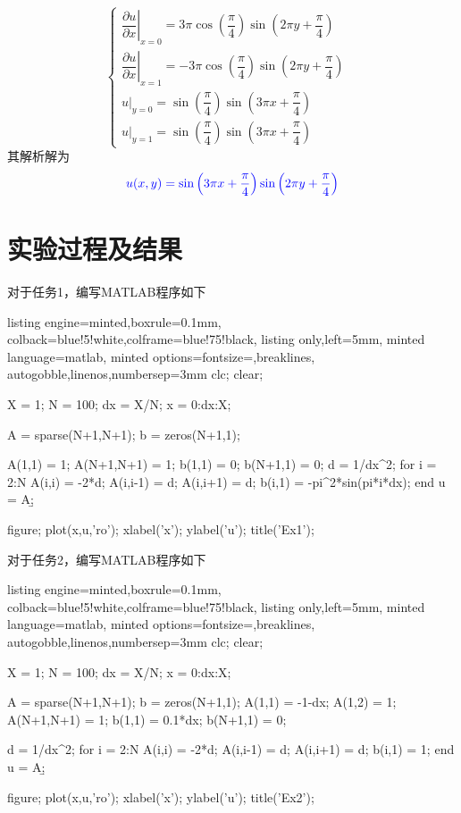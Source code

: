 \documentclass[12pt]{article}
\begin{document}
\begin{description}
\begin{equation*}
\begin{cases}
            \left.\dfrac{\partial u}{\partial x}\right|_{x=0}=3\pi\cos\left(\dfrac{\pi}{4}\right)\sin\left(2\pi y+\dfrac{\pi}{4}\right)&\\
            \left.\dfrac{\partial u}{\partial x}\right|_{x=1}=-3\pi\cos\left(\dfrac{\pi}{4}\right)\sin\left(2\pi y+\dfrac{\pi}{4}\right)&\\
            u|_{y=0}=\sin\left(\dfrac{\pi}{4}\right)\sin\left(3\pi x+\dfrac{\pi}{4}\right)&\\
            u|_{y=1}=\sin\left(\dfrac{\pi}{4}\right)\sin\left(3\pi x+\dfrac{\pi}{4}\right)
        \end{cases}
    \end{equation*}其解析解为\begin{equation*}
        \color{blue}u(x,y)=\sin\left(3\pi x+\dfrac{\pi}{4}\right)\sin\left(2\pi y+\dfrac{\pi}{4}\right)
    \end{equation*}
\end{description}

\newpage
\section{实验过程及结果}
对于任务1，编写MATLAB程序如下
\begin{tcblisting}{listing engine=minted,boxrule=0.1mm,
    colback=blue!5!white,colframe=blue!75!black,
    listing only,left=5mm,
    minted language=matlab,
    minted options={fontsize=\small,breaklines, autogobble,linenos,numbersep=3mm}}
clc;
clear;

X = 1;
N = 100;
dx = X/N;
x = 0:dx:X;

A = sparse(N+1,N+1);
b = zeros(N+1,1);

A(1,1) = 1;
A(N+1,N+1) = 1;
b(1,1) = 0;
b(N+1,1) = 0;
d = 1/dx^2;
for i = 2:N
    A(i,i) = -2*d;
    A(i,i-1) = d;
    A(i,i+1) = d;
    b(i,1) = -pi^2*sin(pi*i*dx);
end
u = A\b;

figure;
plot(x,u,'ro');
xlabel('x');
ylabel('u');
title('Ex1');    
\end{tcblisting}

\newpage
对于任务2，编写MATLAB程序如下
\begin{tcblisting}{listing engine=minted,boxrule=0.1mm,
    colback=blue!5!white,colframe=blue!75!black,
    listing only,left=5mm,
    minted language=matlab,
    minted options={fontsize=\small,breaklines, autogobble,linenos,numbersep=3mm}}
clc;
clear;

X = 1;
N = 100;
dx = X/N;
x = 0:dx:X;

A = sparse(N+1,N+1);
b = zeros(N+1,1);
A(1,1) = -1-dx;
A(1,2) = 1;
A(N+1,N+1) = 1;
b(1,1) = 0.1*dx;
b(N+1,1) = 0;
    
d = 1/dx^2;
for i = 2:N
    A(i,i) = -2*d;
    A(i,i-1) = d;
    A(i,i+1) = d;
    b(i,1) = 1;
 end
u = A\b;

figure;
plot(x,u,'ro');
xlabel('x');
ylabel('u');
title('Ex2');    
\end{tcblisting}
\end{document}
